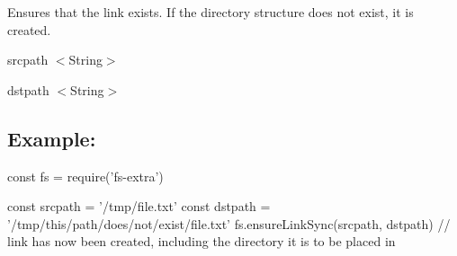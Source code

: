 Ensures that the link exists. If the directory structure does not exist, it is created.


\begin{DoxyItemize}
\item {\ttfamily srcpath} {\ttfamily $<$String$>$}
\item {\ttfamily dstpath} {\ttfamily $<$String$>$}
\end{DoxyItemize}

\subsection*{Example\+:}


\begin{DoxyCode}
const fs = require('fs-extra')

const srcpath = '/tmp/file.txt'
const dstpath = '/tmp/this/path/does/not/exist/file.txt'
fs.ensureLinkSync(srcpath, dstpath)
// link has now been created, including the directory it is to be placed in
\end{DoxyCode}
 